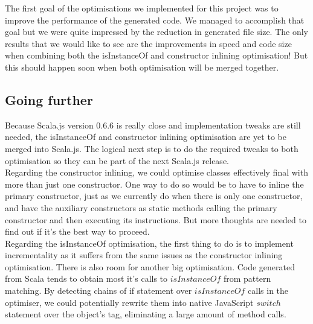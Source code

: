 The first goal of the optimisations we implemented for this project was to
improve the performance of the generated code. We managed to accomplish that
goal but we were quite impressed by the reduction in generated file size.
The only results that we would like to see are the improvements in speed and
code size when combining both the isInstanceOf and constructor inlining
optimisation! But this should happen soon when both optimisation will be merged
together.

\subsection{Going further}
Because Scala.js version 0.6.6 is really close and implementation
tweaks are still needed, the isInstanceOf and constructor inlining optimisation
are yet to be merged into Scala.js. The logical next step is to do the required
tweaks to both optimisation so they can be part of the next Scala.js release.\\
Regarding the constructor inlining, we could optimise classes effectively
final with more than just one constructor. One way to do so would be to have
to inline the primary constructor, just as we currently do when there is
only one constructor, and have the auxiliary constructors as static methods
calling the primary constructor and then executing its instructions. But more
thoughts are needed to find out if it's the best way to proceed.\\
Regarding the isInstanceOf optimisation, the first thing to do is to implement
incrementality as it suffers from the same issues as the constructor inlining
optimisation. There is also room for another big optimisation. Code generated
from Scala tends to obtain most it's calls to $isInstanceOf$ from pattern
matching. By detecting chains of if statement over $isInstanceOf$ calls in the
optimiser, we could potentially rewrite them into native JavaScript $switch$
statement over the object's tag, eliminating a large amount of method calls.